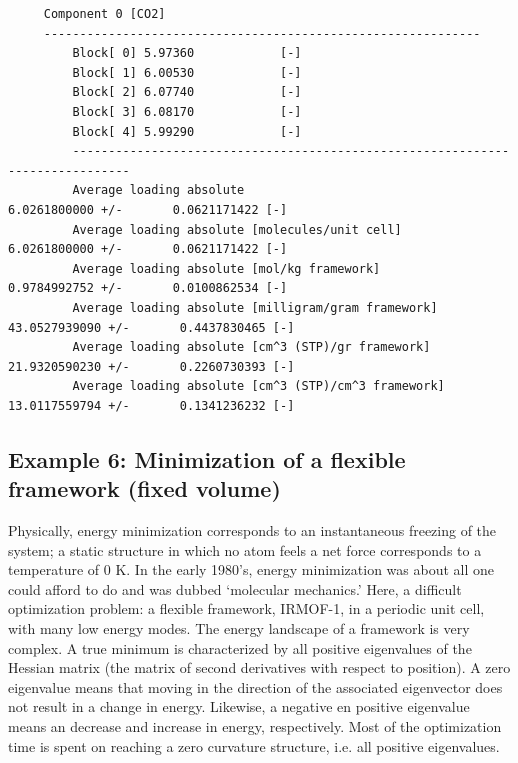 \begin{tiny}
\begin{verbatim}
     Component 0 [CO2]
     -------------------------------------------------------------
         Block[ 0] 5.97360            [-]
         Block[ 1] 6.00530            [-]
         Block[ 2] 6.07740            [-]
         Block[ 3] 6.08170            [-]
         Block[ 4] 5.99290            [-]
         ------------------------------------------------------------------------------
         Average loading absolute                              6.0261800000 +/-       0.0621171422 [-]
         Average loading absolute [molecules/unit cell]        6.0261800000 +/-       0.0621171422 [-]
         Average loading absolute [mol/kg framework]                  0.9784992752 +/-       0.0100862534 [-]
         Average loading absolute [milligram/gram framework]         43.0527939090 +/-       0.4437830465 [-]
         Average loading absolute [cm^3 (STP)/gr framework]          21.9320590230 +/-       0.2260730393 [-]
         Average loading absolute [cm^3 (STP)/cm^3 framework]        13.0117559794 +/-       0.1341236232 [-]
\end{verbatim}
\end{tiny}

\subsection*{Example 6: Minimization of a flexible framework (fixed volume)}

Physically, energy minimization corresponds to an instantaneous freezing of the system; a static structure in 
which no atom feels a net force corresponds to a temperature of 0 K. In the early 1980's, energy minimization was 
about all one could afford to do and was dubbed `molecular mechanics.' Here, a difficult optimization problem:
a flexible framework, IRMOF-1, in a periodic unit cell, with many low energy modes.
The energy landscape of a framework is very complex. A true minimum is characterized by
all positive eigenvalues of the Hessian matrix (the matrix of second derivatives with respect to position). A
zero eigenvalue means that moving in the direction of the associated eigenvector does not result in a change in
energy. Likewise, a negative en positive eigenvalue means an decrease and increase in energy, respectively.
Most of the optimization time is spent on reaching a zero curvature structure, i.e. all positive eigenvalues.

